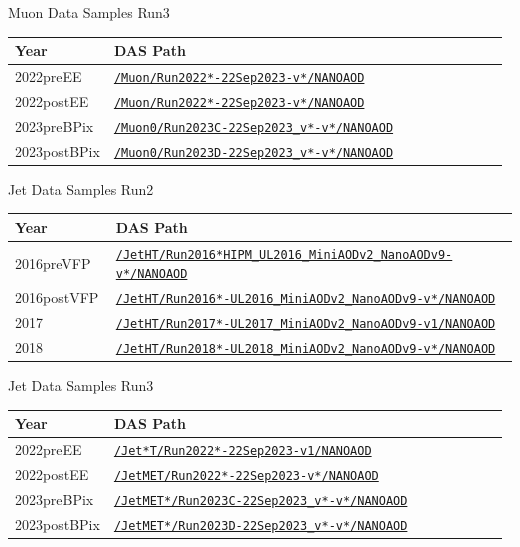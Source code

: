 \documentclass[]{beamer}
\def\daspath#1{\href{https://cmsweb.cern.ch/das/request?view=list\&limit=50\&instance=prod\%2Fglobal\&input=\%2F#1}{\small\nolinkurl{/#1}}}
\begin{document}
\begin{frame}{Muon Data Samples Run3}
  \begin{tabular}{p{0.2\linewidth}p{0.8\linewidth}}
    Year & DAS Path \\ \hline
    2022preEE & \daspath{Muon/Run2022*-22Sep2023-v*/NANOAOD} \\
    2022postEE & \daspath{Muon/Run2022*-22Sep2023-v*/NANOAOD} \\
    2023preBPix & \daspath{Muon0/Run2023C-22Sep2023_v*-v*/NANOAOD} \\
    2023postBPix & \daspath{Muon0/Run2023D-22Sep2023_v*-v*/NANOAOD} \\
  \end{tabular}
\end{frame}

\begin{frame}{Jet Data Samples Run2}
  \begin{tabular}{p{0.2\linewidth}p{0.8\linewidth}}
    Year & DAS Path \\ \hline
    2016preVFP & \daspath{JetHT/Run2016*HIPM_UL2016_MiniAODv2_NanoAODv9-v*/NANOAOD} \\
    2016postVFP & \daspath{JetHT/Run2016*-UL2016_MiniAODv2_NanoAODv9-v*/NANOAOD} \\
    2017 & \daspath{JetHT/Run2017*-UL2017_MiniAODv2_NanoAODv9-v1/NANOAOD} \\
    2018 & \daspath{JetHT/Run2018*-UL2018_MiniAODv2_NanoAODv9-v*/NANOAOD} \\
  \end{tabular}
  
\end{frame}

\begin{frame}{Jet Data Samples Run3}
  \begin{tabular}{p{0.2\linewidth}p{0.8\linewidth}}
    Year & DAS Path \\ \hline
    2022preEE & \daspath{Jet*T/Run2022*-22Sep2023-v1/NANOAOD} \\
    2022postEE & \daspath{JetMET/Run2022*-22Sep2023-v*/NANOAOD} \\
    2023preBPix & \daspath{JetMET*/Run2023C-22Sep2023_v*-v*/NANOAOD} \\
    2023postBPix & \daspath{JetMET*/Run2023D-22Sep2023_v*-v*/NANOAOD} \\
  \end{tabular}
\end{frame}
\end{document}
